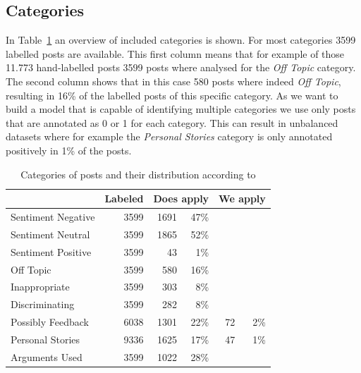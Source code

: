 \documentclass[11pt,a4paper]{article}
\begin{document}
\subsection{Categories}
In Table~\ref{tab:categories} an overview of included categories is shown. For most categories 3599 labelled posts are available. This first column means that for example of those 11.773 hand-labelled posts 3599 posts where analysed for the \textit{Off Topic} category. The second column shows that in this case 580 posts where indeed \textit{Off Topic}, resulting in 16\% of the labelled posts of this specific category. As we want to build a model that is capable of identifying multiple categories we use only posts that are annotated as 0 or 1 for each category. This can result in unbalanced datasets where for example the \textit{Personal Stories} category is only annotated positively in 1\% of the posts. 
\begin{table}
	\centering\small
	\begin{tabular}{l r r r r r}
		& Labeled & \multicolumn{2}{c}{Does apply} & \multicolumn{2}{c}{We apply} \\
		\hline
		Sentiment Negative & 3599 & 1691 & 47\% \\
		Sentiment Neutral & 3599 & 1865 & 52\% \\
		Sentiment Positive & 3599 & 43 & 1\% \\
		Off Topic & 3599 & 580 & 16\% \\
		Inappropriate & 3599 & 303 & 8\%\\
		Discriminating & 3599 & 282 & 8\%\\
		Possibly Feedback & 6038 & 1301 & 22\% & 72 & 2\%\\
		Personal Stories & 9336 & 1625 & 17\% & 47 & 1\%\\
		Arguments Used & 3599 & 1022 & 28\%\\
	\end{tabular}
	\caption{Categories of posts and their distribution according to \cite{Schabus17}}
	\label{tab:categories}
\end{table}


\end{document}
